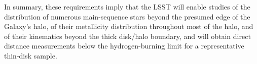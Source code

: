 In summary, these requirements imply that the LSST will enable studies of the
distribution of numerous main-sequence stars beyond the presumed edge of
the Galaxy's halo, of their metallicity distribution throughout most of the
halo, and of their kinematics beyond the thick disk/halo boundary, and will
obtain direct distance measurements below the hydrogen-burning limit for a
representative thin-disk sample.




